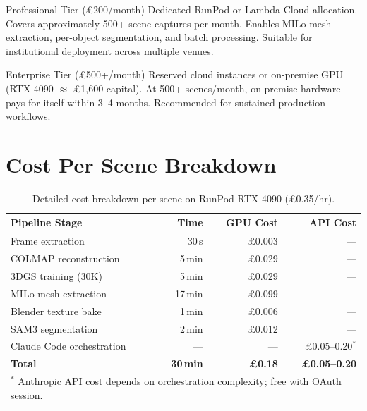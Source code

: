 \begin{recommendation}{Professional Tier (\pounds200/month)}
Dedicated RunPod or Lambda Cloud allocation. Covers approximately 500+ scene captures per month. Enables MILo mesh extraction, per-object segmentation, and batch processing. Suitable for institutional deployment across multiple venues.
\end{recommendation}

\begin{recommendation}{Enterprise Tier (\pounds500+/month)}
Reserved cloud instances or on-premise GPU (RTX 4090 $\approx$ \pounds1,600 capital). At 500+ scenes/month, on-premise hardware pays for itself within 3--4 months. Recommended for sustained production workflows.
\end{recommendation}

\section{Cost Per Scene Breakdown}
\label{sec:cost-breakdown}

\begin{table}[htbp]
\centering
\caption{Detailed cost breakdown per scene on RunPod RTX 4090 (\pounds0.35/hr).}
\label{tab:cost-per-scene}
\begin{tabular}{@{}lrrr@{}}
\toprule
\textbf{Pipeline Stage} & \textbf{Time} & \textbf{GPU Cost} & \textbf{API Cost} \\
\midrule
Frame extraction       & 30\,s  & \pounds0.003 & --- \\
COLMAP reconstruction  & 5\,min & \pounds0.029 & --- \\
3DGS training (30K)    & 5\,min & \pounds0.029 & --- \\
MILo mesh extraction   & 17\,min & \pounds0.099 & --- \\
Blender texture bake   & 1\,min & \pounds0.006 & --- \\
SAM3 segmentation      & 2\,min & \pounds0.012 & --- \\
Claude Code orchestration & ---  & --- & \pounds0.05--0.20$^\ast$ \\
\midrule
\textbf{Total}         & \textbf{30\,min} & \textbf{\pounds0.18} & \textbf{\pounds0.05--0.20} \\
\bottomrule
\multicolumn{4}{l}{\footnotesize $^\ast$ Anthropic API cost depends on orchestration complexity; free with OAuth session.}
\end{tabular}
\end{table}

